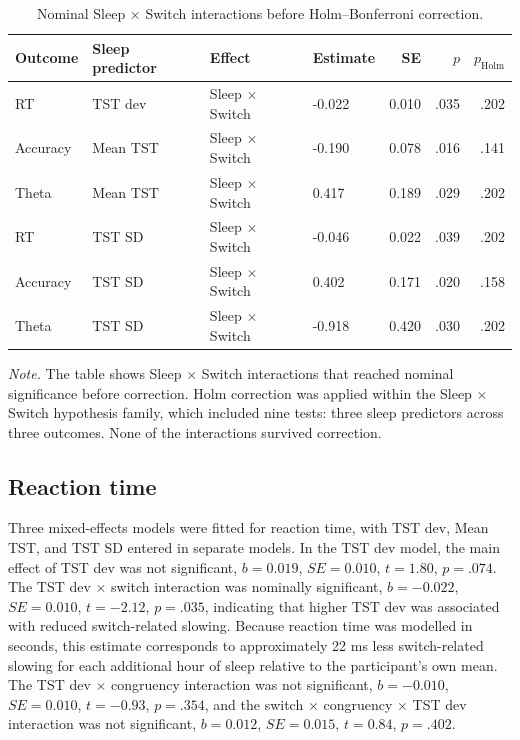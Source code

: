 \documentclass[12pt,a4paper]{report}
\begin{document}
\begin{table}[H]
\centering
\caption{Nominal Sleep \(\times\) Switch interactions before Holm--Bonferroni correction.}
\label{tab:holm_sleep_effects}
\begin{tabular}{llllrrr}
\toprule
Outcome & Sleep predictor & Effect & Estimate & SE & \(p\) & \(p_\mathrm{Holm}\) \\
\midrule
RT & TST dev & Sleep \(\times\) Switch & -0.022 & 0.010 & .035 & .202 \\
Accuracy & Mean TST & Sleep \(\times\) Switch & -0.190 & 0.078 & .016 & .141 \\
Theta & Mean TST & Sleep \(\times\) Switch & 0.417 & 0.189 & .029 & .202 \\
RT & TST SD & Sleep \(\times\) Switch & -0.046 & 0.022 & .039 & .202 \\
Accuracy & TST SD & Sleep \(\times\) Switch & 0.402 & 0.171 & .020 & .158 \\
Theta & TST SD & Sleep \(\times\) Switch & -0.918 & 0.420 & .030 & .202 \\
\bottomrule
\end{tabular}

\vspace{0.2cm}
\begin{minipage}{0.95\linewidth}
\footnotesize
\textit{Note.} The table shows Sleep \(\times\) Switch interactions that reached nominal significance before correction. Holm correction was applied within the Sleep \(\times\) Switch hypothesis family, which included nine tests: three sleep predictors across three outcomes. None of the interactions survived correction.
\end{minipage}
\end{table}


\subsection{Reaction time}

Three mixed-effects models were fitted for reaction time, with TST dev, Mean TST, and TST SD entered in separate models. In the TST dev model, the main effect of TST dev was not significant, \(b = 0.019\), \(SE = 0.010\), \(t = 1.80\), \(p = .074\). The TST dev \(\times\) switch interaction was nominally significant, \(b = -0.022\), \(SE = 0.010\), \(t = -2.12\), \(p = .035\), indicating that higher TST dev was associated with reduced switch-related slowing. Because reaction time was modelled in seconds, this estimate corresponds to approximately 22 ms less switch-related slowing for each additional hour of sleep relative to the participant's own mean. The TST dev \(\times\) congruency interaction was not significant, \(b = -0.010\), \(SE = 0.010\), \(t = -0.93\), \(p = .354\), and the switch \(\times\) congruency \(\times\) TST dev interaction was not significant, \(b = 0.012\), \(SE = 0.015\), \(t = 0.84\), \(p = .402\).
\end{document}
